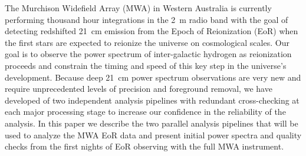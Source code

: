 The Murchison Widefield Array (MWA) in Western Australia is currently
performing thousand hour integrations in the 2~m radio band with the goal of
detecting redshifted 21~cm emission from the Epoch of Reionization
(EoR) when the first stars are expected to reionize the
universe on cosmological scales. Our goal is to observe the power spectrum of inter-galactic hydrogen as reionization
proceeds and constrain the timing and speed of this key step in the universe’s development. Because deep 21~cm power spectrum observations are very new and require unprecedented levels of precision and foreground removal, we have developed of two independent analysis pipelines with redundant cross-checking at each major processing stage to increase our confidence in the reliability of the analysis. In this paper we describe the two parallel analysis pipelines that will be used to analyze the MWA EoR data and present initial power spectra and quality checks from the first nights of EoR observing with the full MWA instrument.